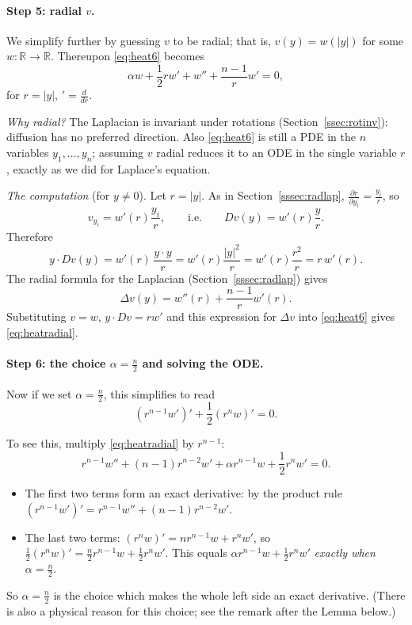 \documentclass[11pt]{article}
\theoremstyle{plain}
\theoremstyle{definition}
\theoremstyle{remark}
\begin{document}
\paragraph{Step 5: radial $v$.}
We simplify further by guessing $v$ to be radial; that is, $v(y) = w(|y|)$ for some $w : \mathbb{R} \to \mathbb{R}$. Thereupon \eqref{eq:heat6} becomes
\begin{equation}\label{eq:heatradial}
\alpha w + \frac12 r w' + w'' + \frac{n-1}{r}w' = 0,
\end{equation}
for $r = |y|$, $' = \frac{d}{dr}$.

\emph{Why radial?} The Laplacian is invariant under rotations (Section~\ref{ssec:rotinv}): diffusion has no preferred direction. Also \eqref{eq:heat6} is still a PDE in the $n$ variables $y_1,\dots,y_n$; assuming $v$ radial reduces it to an ODE in the single variable $r$, exactly as we did for Laplace's equation.

\emph{The computation} (for $y \neq 0$). Let $r = |y|$. As in Section~\ref{sssec:radlap}, $\frac{\partial r}{\partial y_i} = \frac{y_i}{r}$, so
$$ v_{y_i} = w'(r)\frac{y_i}{r}, \qquad\text{i.e.}\qquad Dv(y) = w'(r)\frac{y}{r}. $$
Therefore
$$ y\cdot Dv(y) = w'(r)\,\frac{y\cdot y}{r} = w'(r)\frac{|y|^2}{r} = w'(r)\frac{r^2}{r} = r\,w'(r). $$
The radial formula for the Laplacian (Section~\ref{sssec:radlap}) gives
$$ \Delta v(y) = w''(r) + \frac{n-1}{r}w'(r). $$
Substituting $v = w$, $y\cdot Dv = rw'$ and this expression for $\Delta v$ into \eqref{eq:heat6} gives \eqref{eq:heatradial}.

\paragraph{Step 6: the choice $\alpha = \frac n2$ and solving the ODE.}
Now if we set $\alpha = \frac n2$, this simplifies to read
$$ (r^{n-1}w')' + \frac12(r^n w)' = 0. $$

To see this, multiply \eqref{eq:heatradial} by $r^{n-1}$:
$$ r^{n-1}w'' + (n-1)r^{n-2}w' + \alpha r^{n-1} w + \frac12 r^n w' = 0. $$
\begin{itemize}
    \item The first two terms form an exact derivative: by the product rule $(r^{n-1}w')' = r^{n-1}w'' + (n-1)r^{n-2}w'$.
    \item The last two terms: $(r^n w)' = n r^{n-1}w + r^n w'$, so $\frac12(r^nw)' = \frac n2 r^{n-1}w + \frac12 r^n w'$. This equals $\alpha r^{n-1}w + \frac12 r^nw'$ \emph{exactly when} $\alpha = \frac n2$.
\end{itemize}
So $\alpha = \frac n2$ is the choice which makes the whole left side an exact derivative. (There is also a physical reason for this choice; see the remark after the Lemma below.)
\end{document}
